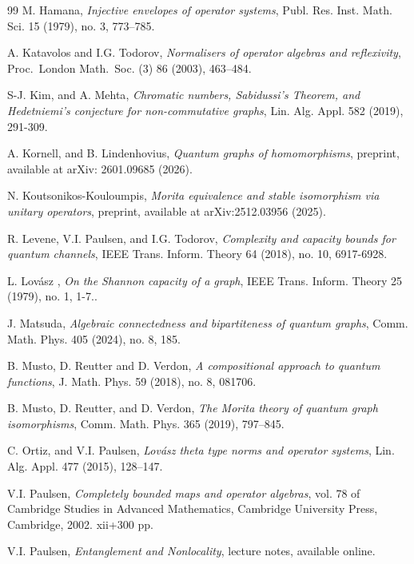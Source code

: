 \documentclass[11pt]{amsart}
\numberwithin{equation}{section}
\theoremstyle{plain}
\theoremstyle{definition}
\theoremstyle{remark}
\begin{document}
\begin{thebibliography}{99}
{\sc M.  Hamana},
{\it Injective envelopes of operator systems},
{\rm Publ. Res. Inst. Math. Sci. 15 (1979), no. 3, 773--785.}

{\sc A. Katavolos and I.G. Todorov},
{\it Normalisers of operator algebras and reflexivity},
{\rm Proc.\ London Math.\ Soc. (3) 86 (2003), 463--484.}

{\sc S-J. Kim, and A. Mehta},
{\it Chromatic numbers, Sabidussi's Theorem, and Hedetniemi's conjecture for non-commutative graphs},
{\rm Lin. Alg. Appl. 582 (2019), 291-309}.

{\sc A. Kornell, and B. Lindenhovius},
{\it Quantum graphs of homomorphisms},
{\rm preprint, available at arXiv: 2601.09685 (2026).}

{\sc N. Koutsonikos-Kouloumpis}, 
{\it Morita equivalence and stable isomorphism via unitary operators}, 
{\rm preprint, available at arXiv:2512.03956 (2025).}

{\sc R. Levene, V.I. Paulsen, and I.G. Todorov},
{\it Complexity and capacity bounds for quantum channels},
{\rm IEEE Trans. Inform. Theory 64 (2018), no. 10, 6917-6928}.

{\sc L. Lov\'asz },
{\it On the Shannon capacity of a graph},
{\rm  IEEE Trans. Inform. Theory 25 (1979), no. 1, 1-7.}.

{\sc J. Matsuda},
{\it Algebraic connectedness and bipartiteness of quantum graphs},
{\rm Comm. Math. Phys. 405 (2024), no. 8, 185.}

{\sc B. Musto, D. Reutter and D. Verdon}, 
{\it A compositional approach to quantum functions}, 
{\rm J. Math. Phys. 59 (2018), no. 8, 081706.}

{\sc B. Musto, D. Reutter, and D. Verdon},  
{\it The Morita theory of quantum graph isomorphisms},  
{\rm Comm. Math. Phys. 365 (2019), 797–845.}  

{\sc C. Ortiz, and V.I. Paulsen}, 
{\it Lovász theta type norms and operator systems}, 
{\rm Lin. Alg. Appl. 477 (2015), 128–147.} 

{\sc V.I. Paulsen},
{\it Completely bounded maps and operator algebras}, 
{\rm vol. 78 of Cambridge Studies in Advanced Mathematics,
Cambridge University Press, Cambridge, 2002. xii+300 pp.}

{\sc V.I. Paulsen},
{\it Entanglement and Nonlocality}, 
{\rm lecture notes,
available online.}


\end{thebibliography}
\end{document}

